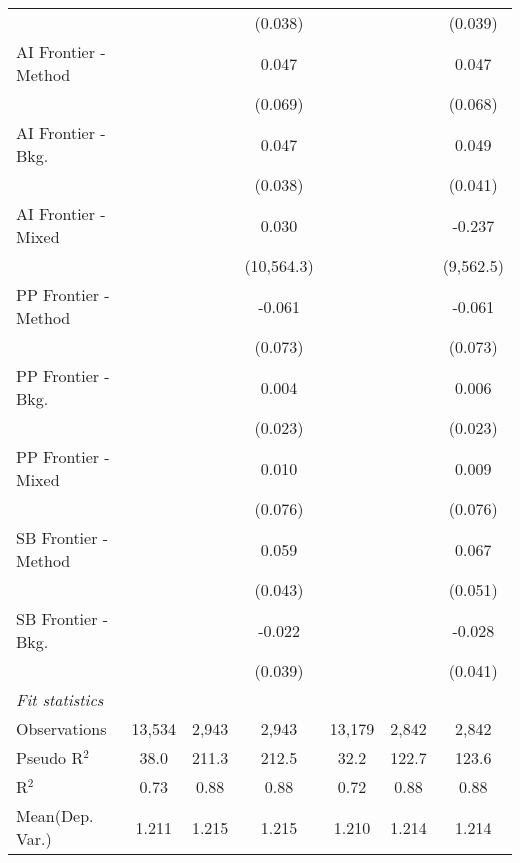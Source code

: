 \begin{tabular}{lcccccc}
                        &               &         & (0.038)     &               &         & (0.039)\\   
   AI Frontier - Method &               &         & 0.047       &               &         & 0.047\\   
                        &               &         & (0.069)     &               &         & (0.068)\\   
   AI Frontier - Bkg.   &               &         & 0.047       &               &         & 0.049\\   
                        &               &         & (0.038)     &               &         & (0.041)\\   
   AI Frontier - Mixed  &               &         & 0.030       &               &         & -0.237\\   
                        &               &         & (10,564.3)  &               &         & (9,562.5)\\   
   PP Frontier - Method &               &         & -0.061      &               &         & -0.061\\   
                        &               &         & (0.073)     &               &         & (0.073)\\   
   PP Frontier - Bkg.   &               &         & 0.004       &               &         & 0.006\\   
                        &               &         & (0.023)     &               &         & (0.023)\\   
   PP Frontier - Mixed  &               &         & 0.010       &               &         & 0.009\\   
                        &               &         & (0.076)     &               &         & (0.076)\\   
   SB Frontier - Method &               &         & 0.059       &               &         & 0.067\\   
                        &               &         & (0.043)     &               &         & (0.051)\\   
   SB Frontier - Bkg.   &               &         & -0.022      &               &         & -0.028\\   
                        &               &         & (0.039)     &               &         & (0.041)\\   
   \midrule
   \emph{Fit statistics}\\
   Observations         & 13,534        & 2,943   & 2,943       & 13,179        & 2,842   & 2,842\\  
   Pseudo R$^2$         & 38.0          & 211.3   & 212.5       & 32.2          & 122.7   & 123.6\\  
   R$^2$                & 0.73          & 0.88    & 0.88        & 0.72          & 0.88    & 0.88\\  
Mean(Dep. Var.) & 1.211 & 1.215 & 1.215 & 1.210 & 1.214 & 1.214 \\
   

\end{tabular}
